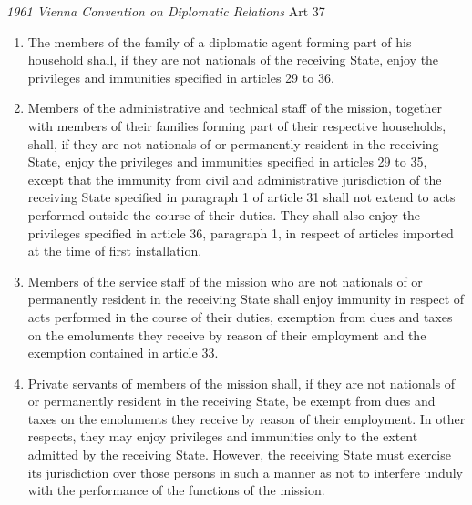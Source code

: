 \begin{conventiondetails}{\textit{1961 Vienna Convention on Diplomatic Relations} Art 37}
    \flushleft
    \begin{enumerate}
        \item The members of the family of a diplomatic agent forming part of his household shall, if they are not nationals of the receiving State, enjoy the privileges and immunities specified in articles 29 to 36.
        \item Members of the administrative and technical staff of the mission, together with members of their families forming part of their respective households, shall, if they are not nationals of or permanently resident in the receiving State, enjoy the privileges and immunities specified in articles 29 to 35, except that the immunity from civil and administrative jurisdiction of the receiving State specified in paragraph 1 of article 31 shall not extend to acts performed outside the course of their duties. They shall also enjoy the privileges specified in article 36, paragraph 1, in respect of articles imported at the time of first installation.
        \item Members of the service staff of the mission who are not nationals of or permanently resident in the receiving State shall enjoy immunity in respect of acts performed in the course of their duties, exemption from dues and taxes on the emoluments they receive by reason of their employment and the exemption contained in article 33.
        \item Private servants of members of the mission shall, if they are not nationals of or permanently resident in the receiving State, be exempt from dues and taxes on the emoluments they receive by reason of their employment. In other respects, they may enjoy privileges and immunities only to the extent admitted by the receiving State. However, the receiving State must exercise its jurisdiction over those persons in such a manner as not to interfere unduly with the performance of the functions of the mission.
    \end{enumerate}
\end{conventiondetails}


